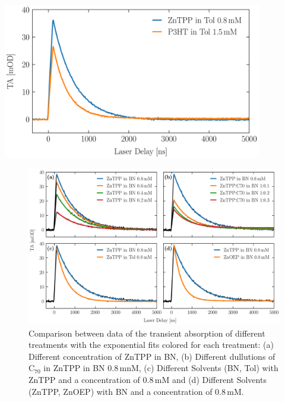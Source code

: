 \begin{center}
    \captionsetup{type = figure}
    \includegraphics[width = 0.85\textwidth]{Pictures/Evaluation/42/Difference.pdf}
    \label{fig:difference}
\end{center}

\begin{center}
    \begin{figure}
    \centering
    \includegraphics[width = 0.9\textheight]{Pictures/Evaluation/42/Lifetime.pdf}
    \caption{
        Comparison between data of the transient absorption of different treatments with the exponential fits colored for each treatment: (a) Different concentration of ZnTPP in BN, (b) Different dullutions of C$_{70}$ in ZnTPP in BN 0.8\,mnM, (c) Different Solvents (BN, Tol) with ZnTPP and a concentration of 0.8\,mM and (d) Different Solvents (ZnTPP, ZnOEP) with BN and a concentration of 0.8\,mM.
    }
    \label{fig:lifetimeDecay}
    \end{figure}
\end{center}
\newpage

